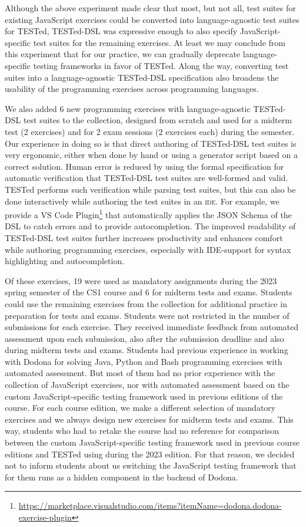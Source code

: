 \documentclass[../main]{subfiles}
\begin{document}
Although the above experiment made clear that most, but not all, test suites for existing JavaScript exercises could be converted into language-agnostic test suites for TESTed, TESTed-DSL was expressive enough to also specify JavaScript-specific test suites for the remaining exercises.
At least we may conclude from this experiment that for our practice, we can gradually deprecate language-specific testing frameworks in favor of TESTed.
Along the way, converting test suites into a language-agnostic TESTed-DSL specification also broadens the usability of the programming exercises across programming languages.

We also added 6 new programming exercises with language-agnostic TESTed-DSL test suites to the collection, designed from scratch and used for a midterm test (2 exercises) and for 2 exam sessions (2 exercises each) during the semester.
Our experience in doing so is that direct authoring of TESTed-DSL test suites is very ergonomic, either when done by hand or using a generator script based on a correct solution.
Human error is reduced by using the formal specification for automatic verification that TESTed-DSL test suites are well-formed and valid.
TESTed performs such verification while parsing test suites, but this can also be done interactively while authoring the test suites in an \textsc{ide}.
For example, we provide a VS Code Plugin\footnote{\url{https://marketplace.visualstudio.com/items?itemName=dodona.dodona-exercise-plugin}} that automatically applies the JSON Schema of the DSL to catch errors and to provide autocompletion.
The improved readability of TESTed-DSL test suites further increases productivity and enhances comfort while authoring programming exercises, especially with \textsc{IDE}-support for syntax highlighting and autocompletion.

Of these exercises, \num{19} were used as mandatory assignments during the 2023 spring semester of the CS1 course and \num{6} for midterm tests and exams.
Students could use the remaining exercises from the collection for additional practice in preparation for tests and exams.
Students were not restricted in the number of submissions for each exercise.
They received immediate feedback from automated assessment upon each submission, also after the submission deadline and also during midterm tests and exams.
Students had previous experience in working with Dodona for solving Java, Python and Bash programming exercises with automated assessment.
But most of them had no prior experience with the collection of JavaScript exercises, nor with automated assessment based on the custom JavaScript-specific testing framework used in previous editions of the course.
For each course edition, we make a different selection of mandatory exercises and we always design new exercises for midterm tests and exams.
This way, students who had to retake the course had no reference for comparison between the custom JavaScript-specific testing framework used in previous course editions and TESTed using during the 2023 edition.
For that reason, we decided not to inform students about us switching the JavaScript testing framework that for them runs as a hidden component in the backend of Dodona.
\end{document}
